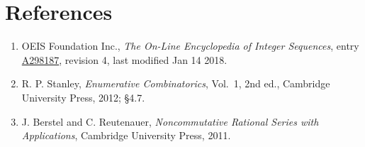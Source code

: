 \documentclass[11pt]{article}
\theoremstyle{definition}
\begin{document}
\section{References}

\begin{enumerate}

\item OEIS Foundation Inc., \emph{The On-Line Encyclopedia of Integer Sequences}, entry \href{https://oeis.org/A298187}{A298187}, revision 4, last modified Jan 14 2018.

\item R. P. Stanley, \emph{Enumerative Combinatorics}, Vol.~1, 2nd ed., Cambridge University Press, 2012; \S4.7.

\item J. Berstel and C. Reutenauer, \emph{Noncommutative Rational Series with Applications}, Cambridge University Press, 2011.

\end{enumerate}
\end{document}
